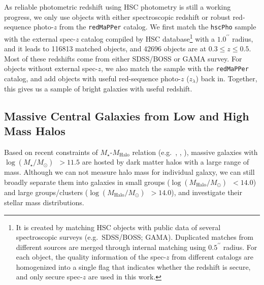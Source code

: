 \documentclass[preprint]{aastex}
\def\arcsec{{\prime\prime}}
\def\redm{\texttt{redMaPPer}}
\def\logms{{$\log (M_{\star}/M_{\odot})$}~}
\def\logmh{{$\log (M_{\mathrm{Halo}}/M_{\odot})$}~}
\begin{document}
\begin{CJK*}{UTF8}{gbsn}
    As reliable photometric redshift using HSC photometry is still a working progress, 
    we only use objects with either spectroscopic redshift or robust red-sequence 
    photo-$z$ from the \redm{} catalog.  
    We first match the \texttt{hscPho} sample with the external spec-$z$ catalog 
    compiled by HSC database\footnote{It is created by matching HSC objects with 
    public data of several spectroscopic surveys (e.g.\ SDSS/BOSS; GAMA). 
    Duplicated matches from different sources are merged through internal matching 
    using $0.5^{\arcsec}$ radius. 
    For each object, the quality information of the spec-$z$ from different catalogs are 
    homogenized into a single flag that indicates whether the redshift is secure, and 
    only secure spec-$z$ are used in this work.}
    with a $1.0^{\arcsec}$ radius, and it leads to 116813 matched objects, and 
    42696 objects are at $0.3 \leq z \leq 0.5$.
    Most of these redshifts come from either SDSS/BOSS or GAMA survey.
    For objects without external spec-$z$, we also match the sample with the \redm{}
    catalog, and add objects with useful red-sequence photo-$z$ ($z_{\lambda}$)
    back in.      
    Together, this gives us a sample of bright galaxies with useful redshift.
    
\subsection{Massive Central Galaxies from Low and High Mass Halos}
    
    Based on recent constraints of $M_{\star}$-$M_{\mathrm{Halo}}$ relation 
    (e.g.\ \citealt{Leauthaud2012}, \citealt{Behroozi2013}, \citealt{Kravtsov2014}), 
    massive galaxies with \logms$ > 11.5$ are hosted by dark matter halos with a 
    large range of mass. 
    Although we can not measure halo mass for individual galaxy, we can still broadly 
    separate them into galaxies in small groups (\logmh$<14.0$) and large groups/clusters
    (\logmh$>14.0$), and investigate their stellar mass distributions. 
    

\end{CJK*}
\end{document}
